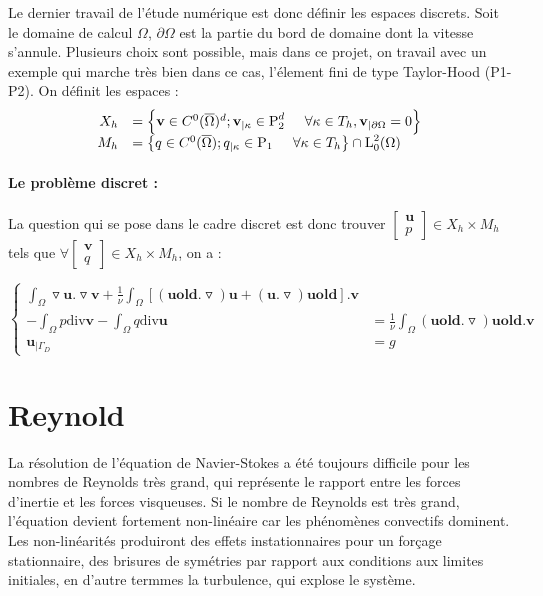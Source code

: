 \documentclass{book}
\begin{document}
Le dernier travail de l'étude numérique est donc définir les espaces discrets. Soit le domaine de calcul $\Omega$, $\partial\Omega$ est la partie du bord de domaine dont la vitesse s'annule. Plusieurs choix sont possible, mais dans ce projet, on travail avec un exemple qui marche très bien dans ce cas, l'élement fini de type Taylor-Hood (P1-P2). On définit les espaces :
\[
\begin{array}{rl}
X_h &= \left\{ \textbf{v}\in C^0(\overline{\Omega})^d; \textbf{v}_{|\kappa}\in \text{P}^d_2 \hspace{0.5cm} \forall \kappa \in T_h, \textbf{v}_{|\partial\Omega}=0 \right\}         \\

M_h &= \left\{ q\in C^0(\overline{\Omega});q_{|\kappa}\in \text{P}_1 \hspace{0.5cm} \forall \kappa \in T_h \right\}\cap\text{L}^2_0(\Omega) 
\end{array}
\]
\paragraph{Le problème discret :}La question qui se pose dans le cadre discret est donc trouver $\left[\begin{array}{cc} \textbf{u}\\ p\end{array}\right] \in X_h \times M_h$ tels que $\forall \left[\begin{array}{cc} \textbf{v}\\ q\end{array}\right] \in X_h \times M_h$, on a : 

\[
\left\{
\begin{array}{rl}
\int_{\Omega} \triangledown \textbf{u}.\triangledown \textbf{v}
+\frac{1}{\nu}\int_{\Omega} [( \textbf{uold}. \triangledown) \textbf{u}+ (\textbf{u} .\triangledown) \textbf{uold}].\textbf{v} &\\ 

-\int_{\Omega} p\text{div}\textbf{v}
 
-\int_{\Omega} q\text{div}\textbf{u} &=

 \frac{1}{\nu}\int_{\Omega}(\textbf{uold}.\triangledown)\textbf{uold}.\textbf{v}\\
\textbf{u}_{|\Gamma_D}  &=g 
\end{array}
\right.
\]

\section{Reynold}
La résolution de l'équation de Navier-Stokes a été toujours difficile pour les nombres de Reynolds très grand, qui représente le rapport entre les forces d'inertie et les forces visqueuses. Si le nombre de Reynolds est très grand, l'équation devient fortement non-linéaire car les phénomènes convectifs dominent. Les non-linéarités produiront des effets instationnaires pour un forçage stationnaire, des brisures de symétries par rapport aux conditions aux limites initiales, en d'autre termmes la turbulence, qui explose le système. 
\end{document}
